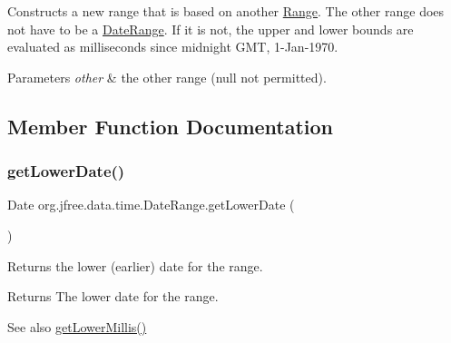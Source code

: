Constructs a new range that is based on another \mbox{\hyperlink{classorg_1_1jfree_1_1data_1_1_range}{Range}}. The other range does not have to be a \mbox{\hyperlink{classorg_1_1jfree_1_1data_1_1time_1_1_date_range}{Date\+Range}}. If it is not, the upper and lower bounds are evaluated as milliseconds since midnight G\+MT, 1-\/\+Jan-\/1970.


\begin{DoxyParams}{Parameters}
{\em other} & the other range ({\ttfamily null} not permitted). \\
\hline
\end{DoxyParams}


\subsection{Member Function Documentation}
\mbox{\label{classorg_1_1jfree_1_1data_1_1time_1_1_date_range_a81157ae9e57975ecb7e167ba7678ff97}} 
\subsubsection{\texorpdfstring{get\+Lower\+Date()}{getLowerDate()}}
{\footnotesize\ttfamily Date org.\+jfree.\+data.\+time.\+Date\+Range.\+get\+Lower\+Date (\begin{DoxyParamCaption}{ }\end{DoxyParamCaption})}

Returns the lower (earlier) date for the range.

\begin{DoxyReturn}{Returns}
The lower date for the range.
\end{DoxyReturn}
\begin{DoxySeeAlso}{See also}
\mbox{\hyperlink{classorg_1_1jfree_1_1data_1_1time_1_1_date_range_a8ab817de415731da19c92aa498d62f33}{get\+Lower\+Millis()}} 
\end{DoxySeeAlso}
\mbox{\label{classorg_1_1jfree_1_1data_1_1time_1_1_date_range_a8ab817de415731da19c92aa498d62f33}} 
